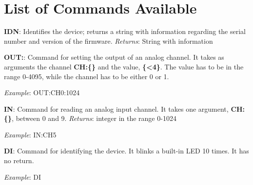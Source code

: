 \section{List of Commands Available}\label{list-of-commandsavailable}
\textbf{{IDN}}: Identifies the device; returns a string with information
regarding the serial number and version of the firmware. \emph{Returns}:
String with information

\textbf{{OUT}:}: Command for setting the output of an analog channel. It
takes as arguments the channel \textbf{{CH}:\{\}} and the value,
\textbf{\{\textless{}4\}}. The value has to be in the range 0-4095,
while the channel has to be either 0 or 1.

\emph{Example}: {OUT}:{CH0}:1024

\textbf{{IN}}: Command for reading an analog input channel. It takes one
argument, \textbf{{CH}:\{\}}, between 0 and 9. \emph{Returns}: integer
in the range 0-1024

\emph{Example}: {IN}:{CH5}

\textbf{{DI}}: Command for identifying the device. It blinks a built-in LED 10 times.
It has no return.

\emph{Example}: {DI}
